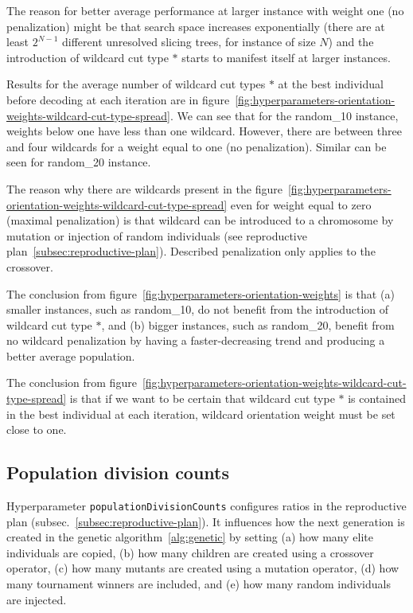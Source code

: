 The reason for better average performance at larger instance with weight one (no penalization) might
be that search space increases exponentially (there are at least $2^{N-1}$ different unresolved slicing trees, for instance of size $N$) and the introduction of wildcard cut type $*$ starts to manifest itself
at larger instances.

Results for the average number of wildcard cut types $*$ at the best individual before decoding at each iteration are in
figure~\ref{fig:hyperparameters-orientation-weights-wildcard-cut-type-spread}.
We can see that for the random\_10 instance, weights below one have less than one wildcard.
However, there are between three and four wildcards for a weight equal to one (no penalization).
Similar can be seen for random\_20 instance.

The reason why there are wildcards present in the figure~\ref{fig:hyperparameters-orientation-weights-wildcard-cut-type-spread}
even for weight equal to zero (maximal penalization) is that wildcard can be introduced to a chromosome by mutation or injection of random individuals (see reproductive plan~\ref{subsec:reproductive-plan}).
Described penalization only applies to the crossover.

The conclusion from figure~\ref{fig:hyperparameters-orientation-weights} is that (a) smaller instances, such as random\_10, do not benefit from the introduction of wildcard cut type $*$, and (b) bigger instances, such as random\_20, benefit from no wildcard penalization by having a faster-decreasing trend and producing a better average population.

The conclusion from figure~\ref{fig:hyperparameters-orientation-weights-wildcard-cut-type-spread} is that if we want to be certain that wildcard cut type $*$ is contained in the best individual at each iteration,
wildcard orientation weight must be set close to one.

\subsection{Population division counts}\label{subsec:population-division-counts}
Hyperparameter \verb|populationDivisionCounts| configures ratios in the reproductive plan (subsec.~\ref{subsec:reproductive-plan}).
It influences how the next generation is created in the genetic algorithm~\ref{alg:genetic}
by setting (a) how many elite individuals are copied, (b) how many children are created using a crossover operator,
(c) how many mutants are created using a mutation operator, (d) how many tournament winners are included, and (e) how many random individuals are injected.

